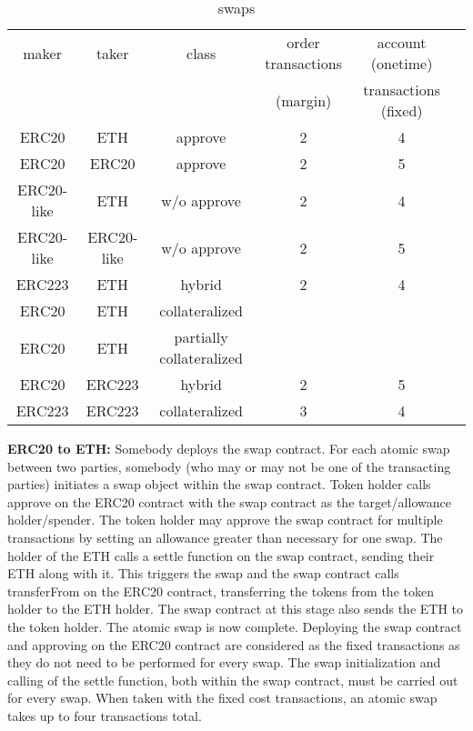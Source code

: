 \begin{table}[h!]
\footnotesize
\centering
\begin{tabular}{ |c|c|c|c|c|c| }
  \hline
   maker & taker & class & order transactions  & account (onetime)  \\
   & & &(margin) &  transactions (fixed) \\ \hline
   ERC20 & ETH & approve & 2 & 4 \\ \hline
   ERC20 & ERC20 & approve & 2 & 5 \\ \hline
   ERC20-like & ETH & w/o approve & 2 & 4 \\ \hline
   ERC20-like & ERC20-like & w/o approve & 2 & 5 \\ \hline
   ERC223 & ETH & hybrid & 2 & 4\\ \hline
   ERC20 & ETH & collateralized & &\\ \hline
   ERC20 & ETH & partially collateralized & &\\ \hline
   ERC20 & ERC223 & hybrid & 2 & 5 \\ \hline
   ERC223 & ERC223 & collateralized & 3 & 4\\ \hline
\end{tabular}
\caption {swaps}
\end{table}\label{Table:Comparison of different swaps}
\textbf{ERC20 to ETH:}  Somebody deploys the swap contract. For each atomic swap between two parties, somebody (who may or may not be one of the transacting parties) initiates a swap object within the swap contract. Token holder calls approve on the ERC20 contract with the swap contract as the target/allowance holder/spender. The token holder may approve the swap contract for multiple transactions by setting an allowance greater than necessary for one swap. The holder of the ETH calls a settle function on the swap contract, sending their ETH along with it. This triggers the swap and the swap contract calls transferFrom on the ERC20 contract, transferring the tokens from the token holder to the ETH holder. The swap contract at this stage also sends the ETH to the token holder. The atomic swap is now complete. Deploying the swap contract and approving on the ERC20 contract are considered as the fixed transactions as they do not need to be performed for every swap. The swap initialization and calling of the settle function, both within the swap contract, must be carried out for every swap. When taken with the fixed cost transactions, an atomic swap takes up to four transactions total.

